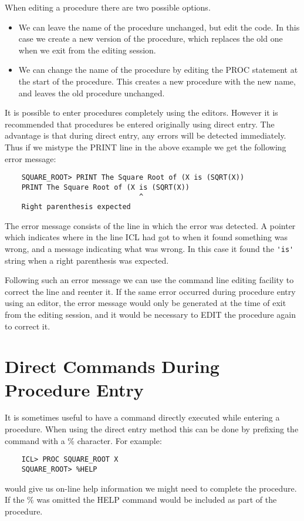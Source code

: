 When editing a procedure there are two possible options.
\begin{itemize}
\item We can leave the name of the procedure unchanged, but edit the code. In
this case we create a new version of the procedure, which replaces the old
one when we exit from the editing session.
\item We can change the name of the procedure by editing the PROC statement
at the start of the procedure. This creates a new procedure with the
new name, and leaves the old procedure unchanged.
\end{itemize}

It is possible to enter procedures completely using the editors. However
it is recommended that procedures be entered originally using direct entry.
The advantage is that during direct entry, any errors will be detected immediately.
Thus if we mistype the PRINT line in the above example we get the following
error message:
\begin{verbatim}
    SQUARE_ROOT> PRINT The Square Root of (X is (SQRT(X))
    PRINT The Square Root of (X is (SQRT(X))
                                ^
    Right parenthesis expected
\end{verbatim}
The error message consists of the line in which the error was detected. A
pointer which indicates where in the line ICL had got to when it found
something was wrong, and a message indicating what was wrong. In this case
it found the \verb+'is'+ string when a right parenthesis was expected.

Following such an error message we can use the command line editing facility
to correct the line and reenter it. If the same error occurred during
procedure entry using an editor, the error message would only be generated
at the time of exit from the editing session, and it would be necessary to 
EDIT the procedure again to correct it.
\section{Direct Commands During Procedure Entry}
It is sometimes useful to have a command directly executed while entering
a procedure. When using the direct entry method this can be done by
prefixing the command with a \% character. For example:
\begin{verbatim}
    ICL> PROC SQUARE_ROOT X
    SQUARE_ROOT> %HELP
\end{verbatim}
would give us on-line help information we might need to complete the
procedure. If the \% was omitted the HELP command would be included as
part of the procedure.

